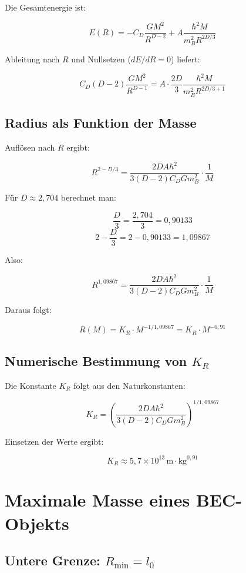 Die Gesamtenergie ist:

\[
E(R) = -C_D \frac{GM^2}{R^{D-2}} + A \frac{\hbar^2 M}{m_B^2 R^{2D/3}} \tag{K.13}
\]

Ableitung nach \( R \) und Nullsetzen (\( dE/dR = 0 \)) liefert:

\[
C_D (D-2) \frac{GM^2}{R^{D-1}} = A \cdot \frac{2D}{3} \frac{\hbar^2 M}{m_B^2 R^{2D/3 + 1}} \tag{K.14}
\]

\subsection{Radius als Funktion der Masse}
\label{sub:bec_radius_formel}

Auflösen nach \( R \) ergibt:

\[
R^{2 - D/3} = \frac{2D A \hbar^2}{3(D-2) C_D G m_B^2} \cdot \frac{1}{M} \tag{K.15}
\]

Für \( D \approx 2,704 \) berechnet man:

\[
\frac{D}{3} = \frac{2,704}{3} = 0,90133
\]
\[
2 - \frac{D}{3} = 2 - 0,90133 = 1,09867
\]

Also:

\[
R^{1,09867} = \frac{2D A \hbar^2}{3(D-2) C_D G m_B^2} \cdot \frac{1}{M}
\]

Daraus folgt:

\[
R(M) = K_R \cdot M^{-1/1,09867} = K_R \cdot M^{-0,91} \tag{K.16}
\]

\subsection{Numerische Bestimmung von \( K_R \)}
\label{sub:bec_kr}

Die Konstante \( K_R \) folgt aus den Naturkonstanten:

\[
K_R = \left( \frac{2D A \hbar^2}{3(D-2) C_D G m_B^2} \right)^{1/1,09867} \tag{K.17}
\]

Einsetzen der Werte ergibt:

\[
K_R \approx 5,7 \times 10^{13} \, \text{m} \cdot \text{kg}^{0,91} \tag{K.18}
\]

\section{Maximale Masse eines BEC-Objekts}
\label{app:bec_max_masse}

\subsection{Untere Grenze: \( R_{\min} = l_0 \)}
\label{sub:bec_min_radius}

